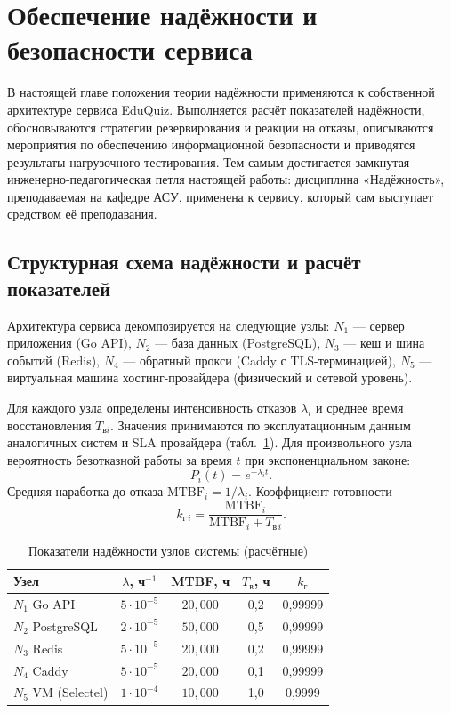 \section{Обеспечение надёжности и безопасности сервиса}
\thispagestyle{plain}

В настоящей главе положения теории надёжности применяются
к собственной архитектуре сервиса EduQuiz. Выполняется расчёт
показателей надёжности, обосновываются стратегии резервирования
и реакции на отказы, описываются мероприятия по обеспечению
информационной безопасности и приводятся результаты нагрузочного
тестирования. Тем самым достигается замкнутая инженерно-педагогическая
петля настоящей работы: дисциплина «Надёжность», преподаваемая
на кафедре АСУ, применена к сервису, который сам выступает
средством её преподавания.

\subsection{Структурная схема надёжности и расчёт показателей}

Архитектура сервиса декомпозируется на следующие узлы:
$N_1$ --- сервер приложения (Go API),
$N_2$ --- база данных (PostgreSQL),
$N_3$ --- кеш и шина событий (Redis),
$N_4$ --- обратный прокси (Caddy с TLS-терминацией),
$N_5$ --- виртуальная машина хостинг-провайдера
(физический и сетевой уровень).

Для каждого узла определены интенсивность отказов $\lambda_i$
и среднее время восстановления $T_{\text{в}i}$. Значения принимаются
по эксплуатационным данным аналогичных систем и SLA провайдера
(табл.~\ref{tab:reliability-nodes}). Для произвольного узла
вероятность безотказной работы за время $t$ при экспоненциальном
законе:
\[
    P_i(t) = e^{-\lambda_i t}.
\]
Средняя наработка до отказа $\text{MTBF}_i = 1 / \lambda_i$.
Коэффициент готовности
\[
    k_{\text{г}\, i} = \frac{\text{MTBF}_i}{\text{MTBF}_i + T_{\text{в}\, i}}.
\]

\begin{table}[!htb]
\fontsize{11pt}{13pt}\selectfont
\centering
\caption{Показатели надёжности узлов системы (расчётные)}
\label{tab:reliability-nodes}
\smallskip
\begin{tabularx}{\linewidth}{|l|c|c|c|c|}
    \hline
    \textbf{Узел} & $\lambda$, ч$^{-1}$ & MTBF, ч & $T_{\text{в}}$, ч & $k_{\text{г}}$ \\
    \hline
        $N_1$ Go API           & $5 \cdot 10^{-5}$ & $20{,}000$ & 0{,}2 & 0{,}99999 \\
    \hline
        $N_2$ PostgreSQL       & $2 \cdot 10^{-5}$ & $50{,}000$ & 0{,}5 & 0{,}99999 \\
    \hline
        $N_3$ Redis            & $5 \cdot 10^{-5}$ & $20{,}000$ & 0{,}2 & 0{,}99999 \\
    \hline
        $N_4$ Caddy            & $5 \cdot 10^{-5}$ & $20{,}000$ & 0{,}1 & 0{,}99999 \\
    \hline
        $N_5$ VM (Selectel)    & $1 \cdot 10^{-4}$ & $10{,}000$ & 1{,}0 & 0{,}9999 \\
    \hline
\end{tabularx}
\end{table}

